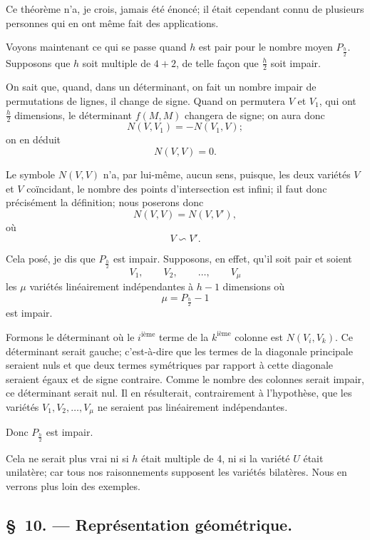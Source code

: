 \documentclass{article}
\begin{document}
Ce théorème n'a, je crois, jamais été énoncé; il était cependant connu de plusieurs personnes qui en ont même fait des applications.

Voyons maintenant ce qui se passe quand $h$ est pair pour le nombre moyen $P_{\frac{h}{2}}$. Supposons que $h$ soit multiple de $4 + 2$, de telle façon que $\frac{h}{2}$ soit impair.

On sait que, quand, dans un déterminant, on fait un nombre impair de permutations de lignes, il change de signe. Quand on permutera $V$ et $V_{1}$, qui ont $\frac{h}{2}$ dimensions, le déterminant $f(M, M)$ changera de signe; on aura donc
\[
N(V, V_{1}) = -N(V_{1}, V);
\]
on en déduit
\[
N(V, V) = 0.
\]

Le symbole $N(V, V)$ n'a, par lui-même, aucun sens, puisque, les deux variétés $V$ et $V$ coïncidant, le nombre des points d'intersection est infini;
il faut donc précisément la définition; nous poserons donc
\[
N(V, V) = N(V, V'),
\]
où
\[
V \backsim V'.
\]

Cela posé, je dis que $P_{\frac{h}{2}}$ est impair. Supposons, en effet, qu'il soit pair et soient
\[
V_{1}, \qquad V_{2}, \qquad \ldots, \qquad V_{\mu}
\]
les $\mu$ variétés linéairement indépendantes à $h-1$ dimensions où
\[
\mu = P_{\frac{h}{2}} - 1
\]
est impair.

Formons le déterminant où le $i^{\text{ième}}$ terme de la $k^{\text{ième}}$ colonne est $N(V_{i}, V_{k})$. Ce déterminant serait gauche; c'est-à-dire que les termes de la diagonale principale seraient nuls et que deux termes symétriques par rapport à cette diagonale seraient égaux et de signe contraire. Comme le nombre des colonnes serait impair, ce déterminant serait nul. Il en résulterait, contrairement à l'hypothèse, que les variétés $V_{1}, V_{2}, \ldots, V_{\mu}$ ne seraient pas linéairement indépendantes.

Donc $P_{\frac{h}{2}}$ est impair.

Cela ne serait plus vrai ni si $h$ était multiple de 4, ni si la variété $U$ était unilatère; car tous nos raisonnements supposent les variétés bilatères. Nous en verrons plus loin des exemples.

\subsection*{\S~10. --- Représentation géométrique.}
\end{document}
